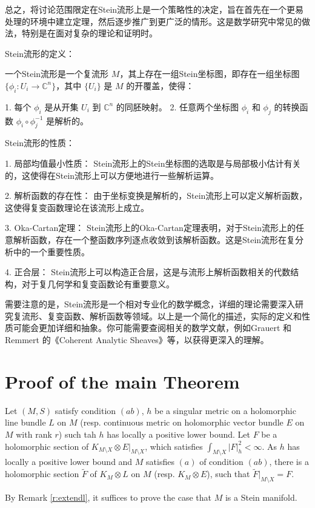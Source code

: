 \begin{description}
总之，将讨论范围限定在Stein流形上是一个策略性的决定，旨在首先在一个更易处理的环境中建立定理，然后逐步推广到更广泛的情形。这是数学研究中常见的做法，特别是在面对复杂的理论和证明时。
\end{description}




\begin{remark}
  Stein流形的定义：

一个Stein流形是一个复流形 \(M\)，其上存在一组Stein坐标图，即存在一组坐标图 \(\{\phi_i: U_i \rightarrow \mathbb{C}^n\}\)，其中 \(\{U_i\}\) 是 \(M\) 的开覆盖，使得：

1. 每个 \(\phi_i\) 是从开集 \(U_i\) 到 \(\mathbb{C}^n\) 的同胚映射。
2. 任意两个坐标图 \(\phi_i\) 和 \(\phi_j\) 的转换函数 \(\phi_i \circ \phi_j^{-1}\) 是解析的。

Stein流形的性质：

1. 局部均值最小性质： Stein流形上的Stein坐标图的选取是与局部极小估计有关的，这使得在Stein流形上可以方便地进行一些解析运算。

2. 解析函数的存在性： 由于坐标变换是解析的，Stein流形上可以定义解析函数，这使得复变函数理论在该流形上成立。

3. Oka-Cartan定理： Stein流形上的Oka-Cartan定理表明，对于Stein流形上的任意解析函数，存在一个整函数序列逐点收敛到该解析函数。这是Stein流形在复分析中的一个重要性质。

4. 正合层： Stein流形上可以构造正合层，这是与流形上解析函数相关的代数结构，对于复几何学和复变函数论有重要意义。

需要注意的是，Stein流形是一个相对专业化的数学概念，详细的理论需要深入研究复流形、复变函数、解析函数等领域。以上是一个简化的描述，实际的定义和性质可能会更加详细和抽象。你可能需要查阅相关的数学文献，例如Grauert 和 Remmert 的《Coherent Analytic Sheaves》等，以获得更深入的理解。
\end{remark}

\section{Proof of the main Theorem}
\begin{Remark}
  \label{r:extendl} Let $(M,S)$ satisfy condition $(ab)$, $h$ be a
singular metric on a holomorphic line bundle $L$ on $M$ (resp.
continuous metric on holomorphic vector bundle $E$ on $M$ with rank
$r$) such tah $h$ has locally a positive lower bound. Let $F$ be a
holomorphic section of $K_{M\setminus X}\otimes E|_{M\setminus X}$,
which satisfies $\int_{M\setminus X}|F|^{2}_{h}<\infty$. As $h$ has
locally a positive lower bound and $M$ satisfies $(a)$ of condition
$(ab)$, there is a holomorphic section $\tilde{F}$ of $K_{M}\otimes
L$ on $M$ (resp. $K_{M}\otimes E$), such that
$\tilde{F}|_{M\setminus X}=F$.
\end{Remark}
By Remark \ref{r:extendl}, it suffices to prove the case that $M$ is a Stein manifold.

